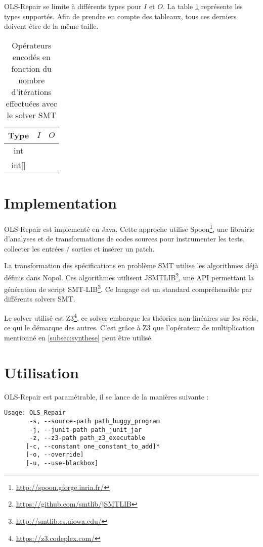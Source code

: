 OLS-Repair se limite à différents types pour $I$ et $O$. La table \ref{table:IO} représente les types supportés. Afin de  prendre en compte des tableaux, tous ces derniers doivent être de la même taille.

\begin{table}[H]
\centering
\begin{tabular}{|c|c|c|}
  \hline
  Type & $I$ & $O$ \\
  \hline
  int 		& \checkmark & \checkmark \\
  int[] 	& \checkmark & \ding{56} \\
  \hline
\end{tabular}

\caption{Opérateurs encodés en fonction du nombre d'itérations effectuées avec le solver SMT}
\label{table:IO}
\end{table}


\section{Implementation}
\label{sec:implementation}

\par OLS-Repair est implementé en Java. Cette approche utilise Spoon\footnote{\url{http://spoon.gforge.inria.fr/}}, une librairie d'analyses et de transformations de codes sources pour instrumenter les tests, collecter les entrées / sorties et insérer un patch.
\par La transformation des spécifications en problème SMT utilise les algorithmes déjà définis dans Nopol\cite{nopol}. Ces algorithmes utilisent JSMTLIB\footnote{\url{https://github.com/smtlib/jSMTLIB}}, une API permettant la génération de script SMT-LIB\footnote{\url{http://smtlib.cs.uiowa.edu/}}. Ce langage est un standard compréhensible par différents solvers SMT.
\par Le solver utilisé est Z3\footnote{\url{https://z3.codeplex.com/}}, ce solver embarque les théories non-linéaires sur les réels, ce qui le démarque des autres. C'est grâce à Z3 que l'opérateur de multiplication mentionné en \ref{subsec:synthese} peut être utilisé.


\section{Utilisation}

OLS-Repair est paramétrable, il se lance de la manières suivante :
\\
\begin{verbatim}
Usage: OLS_Repair
       -s, --source-path path_buggy_program
       -j, --junit-path path_junit_jar
       -z, --z3-path path_z3_executable
      [-c, --constant one_constant_to_add]*
      [-o, --override]
      [-u, --use-blackbox]
\end{verbatim}


	

	
		
		
		